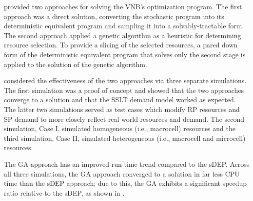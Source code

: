 \documentclass[12pt,dvipsnames]{report}
\begin{document}
 provided two approaches for solving the VNB's optimization program.  The first approach was a direct solution, converting the stochastic program into its deterministic equivalent program and sampling it into a solvably-tractable form.  The second approach applied a genetic algorithm as a heuristic for determining resource selection.  To provide a slicing of the selected resources, a pared down form of the deterministic equivalent program that solves only the second stage is applied to the solution of the genetic algorithm. 

 considered the effectiveness of the two approaches via three separate simulations.  The first simulation was a proof of concept and showed that the two approaches converge to a solution and that the SSLT demand model worked as expected.  The latter two simulations served as test cases which modify RP resources and SP demand to more closely reflect real world resources and demand.  The second simulation, Case I, simulated homogeneous (i.e., macrocell) resources and the third simulation, Case II, simulated heterogeneous (i.e., macrocell and microcell) resources.

The GA approach has an improved run time trend compared to the sDEP.  Across all three simulations, the GA approach converged to a solution in far less CPU time than the sDEP approach; due to this, the GA exhibits a significant speedup ratio relative to the sDEP, as shown in .  
\end{document}
